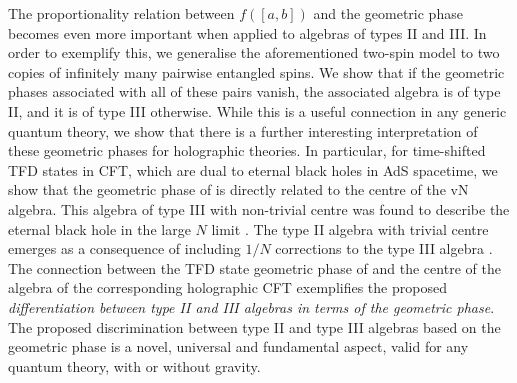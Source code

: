 \documentclass[a4paper,11pt]{article}
\newcommand{\1}{\mathds{1}}
\begin{document}
The proportionality relation between $f([a,b])$ and the geometric phase becomes even more important when applied to algebras of types II and III. In order to exemplify this, we generalise the aforementioned two-spin model to two copies of infinitely many pairwise entangled spins. We show that if the geometric phases associated with all of these pairs vanish, the associated algebra is of type II, and it is of type III otherwise. While this is a useful connection in any generic quantum theory, we show that there is a further interesting interpretation of these geometric phases for holographic theories. In particular, for time-shifted TFD states in CFT, which are dual to eternal black holes in AdS spacetime, we show that the geometric phase of \cite{Nogueira:2021ngh} is directly related to the centre of the vN algebra. This algebra of type III with non-trivial centre was found to describe the eternal black hole in the large $N$ limit \cite{Leutheusser:2021frk,Leutheusser:2021qhd}. The type II algebra with trivial centre emerges as a consequence of including $1/N$ corrections to the type III algebra \cite{Witten:2021unn}. The connection between the TFD state geometric phase of \cite{Nogueira:2021ngh} and the centre of the algebra of the corresponding holographic CFT exemplifies the proposed {\it differentiation between type II and III algebras in terms of the geometric phase}. The proposed discrimination between type II and type III algebras based on the geometric phase is a novel, universal and fundamental aspect, valid for any quantum theory, with or without gravity.
\end{document}
